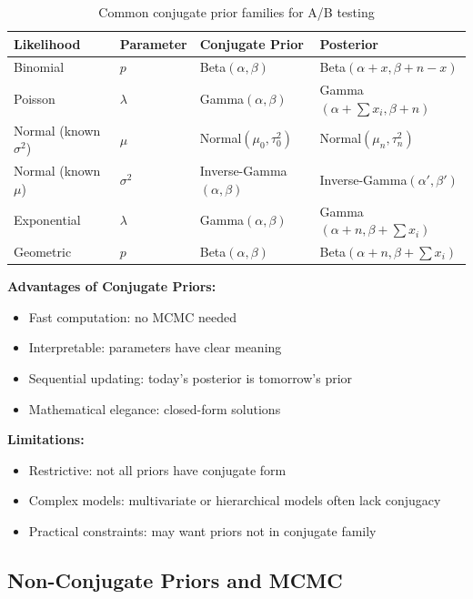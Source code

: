 \begin{table}[h]
\centering
\begin{tabular}{llll}
\toprule
\textbf{Likelihood} & \textbf{Parameter} & \textbf{Conjugate Prior} & \textbf{Posterior} \\
\midrule
Binomial & $p$ & Beta$(\alpha, \beta)$ & Beta$(\alpha + x, \beta + n - x)$ \\
Poisson & $\lambda$ & Gamma$(\alpha, \beta)$ & Gamma$(\alpha + \sum x_i, \beta + n)$ \\
Normal (known $\sigma^2$) & $\mu$ & Normal$(\mu_0, \tau_0^2)$ & Normal$(\mu_n, \tau_n^2)$ \\
Normal (known $\mu$) & $\sigma^2$ & Inverse-Gamma$(\alpha, \beta)$ & Inverse-Gamma$(\alpha', \beta')$ \\
Exponential & $\lambda$ & Gamma$(\alpha, \beta)$ & Gamma$(\alpha + n, \beta + \sum x_i)$ \\
Geometric & $p$ & Beta$(\alpha, \beta)$ & Beta$(\alpha + n, \beta + \sum x_i)$ \\
\bottomrule
\end{tabular}
\caption{Common conjugate prior families for A/B testing}
\label{tab:conjugate_priors}
\end{table}

\textbf{Advantages of Conjugate Priors:}
\begin{itemize}
    \item Fast computation: no MCMC needed
    \item Interpretable: parameters have clear meaning
    \item Sequential updating: today's posterior is tomorrow's prior
    \item Mathematical elegance: closed-form solutions
\end{itemize}

\textbf{Limitations:}
\begin{itemize}
    \item Restrictive: not all priors have conjugate form
    \item Complex models: multivariate or hierarchical models often lack conjugacy
    \item Practical constraints: may want priors not in conjugate family
\end{itemize}

\subsection{Non-Conjugate Priors and MCMC}

